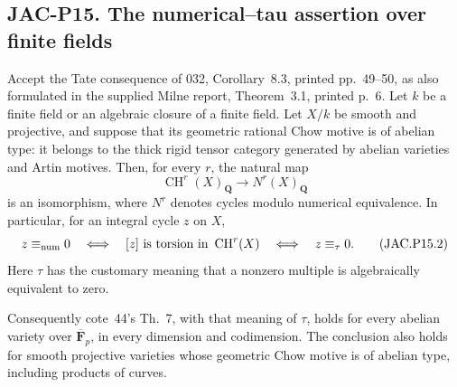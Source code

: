 
\subsection*{JAC-P15. The numerical--tau assertion over finite fields}

\begin{theorem}[JAC-P15]\label{jac:P15}
Accept the Tate consequence of 032, Corollary~8.3, printed
pp.~49--50, as also formulated in the supplied Milne report,
Theorem~3.1, printed p.~6. Let $k$ be a finite field
or an algebraic closure of a finite field. Let $X/k$ be smooth and
projective, and suppose that its geometric rational Chow motive is
of abelian type: it belongs to the thick rigid tensor category
generated by abelian varieties and Artin motives.
Then, for every $r$, the natural map
\[
 \operatorname{CH}^r(X)_{\mathbf Q}
        \longrightarrow N^r(X)_{\mathbf Q}                 \tag{JAC.P15.1}
\]
is an isomorphism, where $N^r$ denotes cycles modulo numerical
equivalence. In particular, for an integral cycle $z$ on $X$,
\[
 z\equiv_{\rm num}0
 \quad\Longleftrightarrow\quad
 [z]\text{ is torsion in }\operatorname{CH}^r(X)
 \quad\Longleftrightarrow\quad
 z\equiv_\tau0.                                           \tag{JAC.P15.2}
\]
Here $\tau$ has the customary meaning that a nonzero multiple is
algebraically equivalent to zero.

Consequently cote~44's Th.~7, with that meaning of $\tau$, holds
for every abelian variety over $\overline{\mathbf F}_p$, in every
dimension and codimension. The conclusion also holds for smooth
projective varieties whose geometric Chow motive is of abelian
type, including products of curves.
\end{theorem}

